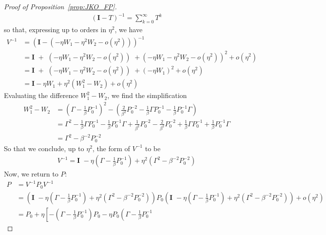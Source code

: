 \documentclass[reqno,11pt,letterpaper]{amsart}
\theoremstyle{plain}
\theoremstyle{definition}
\theoremstyle{remark}
\newcommand{\id}{\mathbf{I}}
\begin{document}
\begin{proof}[Proof of Proposition~\ref{prop:JKO_FP}]
\begin{align*}
    \left(
    \id - T
    \right)^{-1} = \sum_{k=0}^{\infty} T^{k}
\end{align*}
so that, expressing up to orders in $\eta^{2}$, we have
\begin{align*}
    V^{-1} &= \left( \id - \left(- \eta W_{1} - \eta^{2}
      W_{2}  - o(\eta^{2})\right) \right)^{-1}  \\
      &=\id \,\, + \,\,(- \eta W_{1} - \eta^{2}
      W_{2}  - o(\eta^{2})) \,\, + (- \eta W_{1} - \eta^{2}
      W_{2}  - o(\eta^{2}))^{2} + o(\eta^{2}) \\
      &= \id \,\, + \,\,(- \eta W_{1} - \eta^{2}
      W_{2}  - o(\eta^{2})) \,\, + (- \eta W_{1} )^{2} + o(\eta^{2}) \\
      &= \id - \eta W_{1} + \eta^{2} \left( W_{1}^{2} -W_{2} \right) + o(\eta^{2})
\end{align*}
Evaluating the difference $W_{1}^{2} - W_{2}$, we find the simplification
\begin{align*}
    W_{1}^{2} - W_{2} &= \left( \Gamma - \frac{1}{\beta} P_{0}^{-1}
     \right)^{2} - \left(
      \frac{2 }{\beta^{2}} P_{0}^{-2} - \frac{1}{\beta} \Gamma P_{0}^{-1} - \frac{1}{\beta} P_{0}^{-1} \Gamma  
    \right) \\
    &= \Gamma^{2} - \frac{1}{\beta} \Gamma P_{0}^{-1} - \frac{1}{\beta} P_{0}^{-1} \Gamma + \frac{1}{\beta^{2}} P_{0}^{-2} 
    - \frac{2 }{\beta^{2}} P_{0}^{-2} + \frac{1}{\beta} \Gamma P_{0}^{-1} + \frac{1}{\beta} P_{0}^{-1} \Gamma  \\
    &= \Gamma^{2} - \beta^{-2} P_{0}^{-2}
\end{align*}
So that we conclude, up to $\eta^{2}$, the form of $V^{-1}$ to be
\begin{align*}
    V^{-1} = \id \,\, - \eta \left( \Gamma - \frac{1}{\beta} P_{0}^{-1}
     \right) + \eta^{2} \left(
     \Gamma^{2} - \beta^{-2} P_{0}^{-2}
     \right)
\end{align*}
Now, we return to $P$:
\begin{align*}
    P &= V^{-1} P_{0} V^{-1}  \\
    &= \left( \id \,\, - \eta \left( \Gamma - \frac{1}{\beta} P_{0}^{-1}
     \right) + \eta^{2} \left(
     \Gamma^{2} - \beta^{-2} P_{0}^{-2}
     \right) \right) P_{0} \left( \id \,\, - \eta \left( \Gamma - \frac{1}{\beta} P_{0}^{-1}
     \right) + \eta^{2} \left(
     \Gamma^{2} - \beta^{-2} P_{0}^{-2}
     \right) \right) + o(\eta^{2}) \\
     &= P_{0}  + \eta \left[ -\left( \Gamma - \frac{1}{\beta} P_{0}^{-1}
     \right) P_{0} - \eta P_{0} \left( \Gamma - \frac{1}{\beta} P_{0}^{-1}

\end{align*}
\end{proof}
\end{document}
